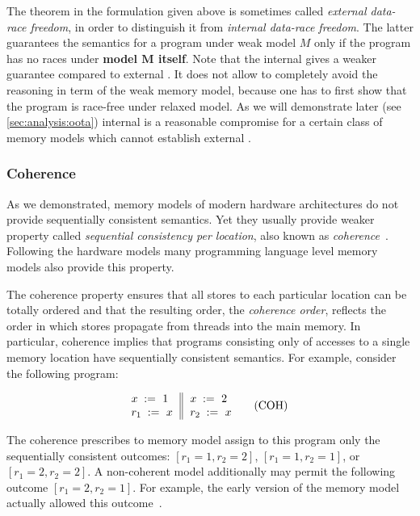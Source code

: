 The \DRF theorem in the formulation given above is 
sometimes called \emph{external data-race freedom},
in order to distinguish it from \emph{internal data-race freedom}. 
The latter guarantees the \SC semantics for a program 
under weak model $M$ only if the program 
has no races under \textbf{model $\mathbf{M}$ itself}.
Note that the internal \DRF gives a weaker guarantee 
compared to external \DRF. It does not allow to completely 
avoid the reasoning in term of the weak memory model, 
because one has to first show that the program 
is race-free under relaxed model. 
As we will demonstrate later (see \cref{sec:analysis:oota})
internal \DRF is a reasonable compromise
for a certain class of memory models which 
cannot establish external \DRF.

\subsubsection{Coherence}
\label{sec:background:coh}

As we demonstrated, memory models of 
modern hardware architectures do not 
provide sequentially consistent semantics.
Yet they usually provide weaker property 
called \emph{sequential consistency per location},
also known as \emph{coherence}~\cite{Alglave-al:TOPLAS14}.
Following the hardware models many programming language level
memory models also provide this property. 

The coherence property ensures that 
all stores to each particular location 
can be totally ordered and that the 
resulting order, the \emph{coherence order}, reflects 
the order in which stores propagate from threads
into the main memory. 
In particular, coherence implies that  
programs consisting only of accesses to 
a single memory location have sequentially consistent semantics.
For example, consider the following program:

\begin{equation*}
\inarrII{
   \writeInst{}{x}{1}   \\
   \readInst{}{r_1}{x}  \\
}{
   \writeInst{}{x}{2}   \\
   \readInst{}{r_2}{x}  \\
}
\tag{COH}\label{ex:coh}
\end{equation*}

The coherence prescribes to memory model 
assign to this program only the 
sequentially consistent outcomes: 
${[r_1=1, r_2=2]}$, ${[r_1=1, r_2=1]}$, or ${[r_1=2, r_2=2]}$.
A non-coherent model additionally may permit 
the following outcome ${[r_1=2, r_2=1]}$.
For example, the early version of the \Java memory model
actually allowed this outcome~\cite{Manson-al:POPL05}.

